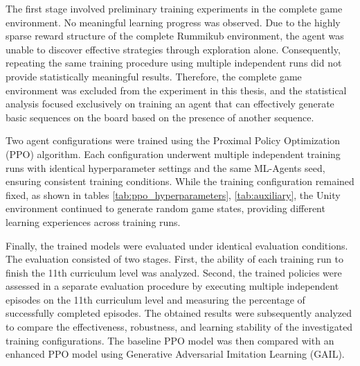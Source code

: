 The first stage involved preliminary training experiments in the complete game environment. No meaningful learning progress was observed. Due to the highly sparse reward structure of the complete Rummikub environment, the agent was unable to discover effective strategies through exploration alone. Consequently, repeating the same training procedure using multiple independent runs did not provide statistically meaningful results. Therefore, the complete game environment was excluded from the experiment in this thesis, and the statistical analysis focused exclusively on training an agent that can effectively generate basic sequences on the board based on the presence of another sequence.


 Two agent configurations were trained using the Proximal Policy Optimization (PPO) algorithm. Each configuration underwent multiple independent training runs with identical hyperparameter settings and the same ML-Agents seed, ensuring consistent training conditions. While the training configuration remained fixed, as shown in tables \ref{tab:ppo_hyperparameters}, \ref{tab:auxiliary}, the Unity environment continued to generate random game states, providing different learning experiences across training runs.

Finally, the trained models were evaluated under identical evaluation conditions. The evaluation consisted of two stages. First, the ability of each training run to finish the 11th curriculum level was analyzed. Second, the trained policies were assessed in a separate evaluation procedure by executing multiple independent episodes on the 11th curriculum level and measuring the percentage of successfully completed episodes. The obtained results were subsequently analyzed to compare the effectiveness, robustness, and learning stability of the investigated training configurations. The baseline PPO model was then compared with an enhanced PPO model using Generative Adversarial Imitation Learning (GAIL).


